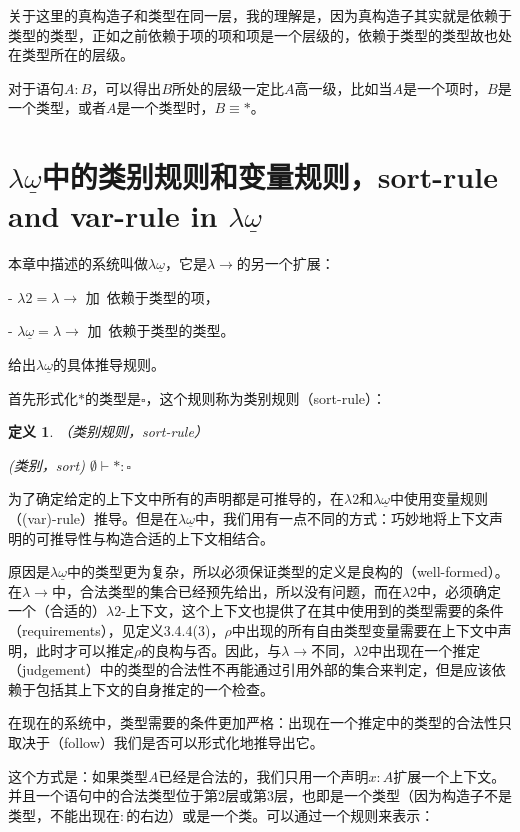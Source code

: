 \documentclass[UTF8]{article}
\newtheorem{thm}{定义}[section]
\begin{document}
		关于这里的真构造子和类型在同一层，我的理解是，因为真构造子其实就是依赖于类型的类型，正如之前依赖于项的项和项是一个层级的，依赖于类型的类型故也处在类型所在的层级。
	
		对于语句$A:B$，可以得出$B$所处的层级一定比$A$高一级，比如当$A$是一个项时，$B$是一个类型，或者$A$是一个类型时，$B\equiv*$。
		
	\section{$\lambda{\underline{\omega}}$中的类别规则和变量规则，sort-rule and var-rule in $\lambda{\underline{\omega}}$}
		\noindent
		本章中描述的系统叫做$\lambda{\underline{\omega}}$，它是$\lambda{\rightarrow}$的另一个扩展：
		
		\noindent
		- $\lambda{2} = \lambda{\rightarrow}$ 加\ 依赖于类型的项，
		
		\noindent
		- $\lambda{\underline{\omega}} = \lambda{\rightarrow}$ 加\ 依赖于类型的类型。
		
		给出$\lambda{\underline{\omega}}$的具体推导规则。
		
		首先形式化$*$的类型是$\square$，这个规则称为类别规则（sort-rule）：
		
		\begin{thm} （类别规则，sort-rule）
			
			(类别，sort) $\emptyset \vdash *:\square$
		\end{thm}
	
		为了确定给定的上下文中所有的声明都是可推导的，在$\lambda{2}$和$\lambda{\underline{\omega}}$中使用变量规则（(var)-rule）推导。但是在$\lambda{\underline{\omega}}$中，我们用有一点不同的方式：巧妙地将上下文声明的可推导性与构造合适的上下文相结合。
		
		原因是$\lambda{\underline{\omega}}$中的类型更为复杂，所以必须保证类型的定义是良构的（well-formed）。在$\lambda{\rightarrow}$中，合法类型的集合已经预先给出，所以没有问题，而在$\lambda{2}$中，必须确定一个（合适的）$\lambda{2}$-上下文，这个上下文也提供了在其中使用到的类型需要的条件（requirements），见定义3.4.4(3)，$\rho$中出现的所有自由类型变量需要在上下文中声明，此时才可以推定$\rho$的良构与否。因此，与$\lambda{\rightarrow}$不同，$\lambda{2}$中出现在一个推定（judgement）中的类型的合法性不再能通过引用外部的集合来判定，但是应该依赖于包括其上下文的自身推定的一个检查。
		
		在现在的系统中，类型需要的条件更加严格：出现在一个推定中的类型的合法性只取决于（follow）我们是否可以形式化地推导出它。
		
		这个方式是：如果类型$A$已经是合法的，我们只用一个声明$x:A$扩展一个上下文。并且一个语句中的合法类型位于第2层或第3层，也即是一个类型（因为构造子不是类型，不能出现在$:$的右边）或是一个类。可以通过一个规则来表示：
		
\end{document}

